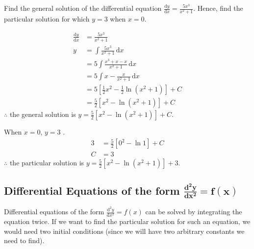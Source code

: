 \documentclass[11pt,a4paper]{book}
\begin{document}
\begin{example}

Find the general solution of the differential equation ${\displaystyle \frac{\mathrm{d}y}{\mathrm{d}x}=\frac{5x^{3}}{x^{2}+1}}$.
Hence, find the particular solution for which $y=3$ when $x=0$.

\Solution

\begin{align*}
\frac{\mathrm{d}y}{\mathrm{d}x} & =\frac{5x^{3}}{x^{2}+1}\\
y & =\int\frac{5x^{3}}{x^{2}+1}\, \mathrm{d}x\\
 & =5\int\frac{x^{3}+x-x}{x^{2}+1}\, \mathrm{d}x\\
 & =5\int x-\frac{x}{x^{2}+1}\, \mathrm{d}x\\
 & =5\left[\frac{1}{2}x^{2}-\frac{1}{2}\ln\left(x^{2}+1\right)\right]+C\\
 & =\frac{5}{2}\left[x^{2}-\ln\left(x^{2}+1\right)\right]+C
\end{align*}
$\therefore$ the general solution is ${\displaystyle y=\frac{5}{2}\left[x^{2}-\ln\left(x^{2}+1\right)\right]+C}$.

When $x=0$, $y=3$ .
\begin{align*}
3 & =\frac{5}{2}\left[0^{2}-\ln1\right]+C\\
C & =3
\end{align*}
$\therefore$ the particular solution is ${\displaystyle y=\frac{5}{2}\left[x^{2}-\ln\left(x^{2}+1\right)\right]+3}$.

\end{example}


\subsection{Differential Equations of the form $\boldsymbol{\frac{\textbf{d}^{2}y}{\textbf{d}x^{2}}=f\left(x\right)}$}
Differential equations of the form ${\displaystyle \frac{\mathrm{d}^{2}y}{\mathrm{d}x^{2}}=f\left(x\right)}$
can be solved by integrating the equation twice. If we want to find
the particular solution for such an equation, we would need two initial
conditions (since we will have two arbitrary constants we need to
find).
\end{document}
